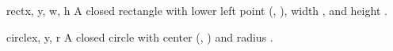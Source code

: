 \begin{classdesc}{rect}{x, y, w, h}
A closed rectangle with lower left point (, ), width , and
  height .
\end{classdesc}

\begin{classdesc}{circle}{x, y, r}
A closed circle with center (, ) and radius .
\end{classdesc}

